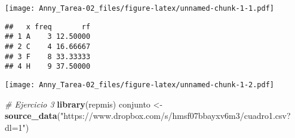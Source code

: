 \documentclass[
]{article}
\newenvironment{Shaded}{\begin{snugshade}}{\end{snugshade}}
\newcommand{\CommentTok}[1]{\textcolor[rgb]{0.56,0.35,0.01}{\textit{#1}}}
\newcommand{\DataTypeTok}[1]{\textcolor[rgb]{0.13,0.29,0.53}{#1}}
\newcommand{\DecValTok}[1]{\textcolor[rgb]{0.00,0.00,0.81}{#1}}
\newcommand{\KeywordTok}[1]{\textcolor[rgb]{0.13,0.29,0.53}{\textbf{#1}}}
\newcommand{\NormalTok}[1]{#1}
\newcommand{\OperatorTok}[1]{\textcolor[rgb]{0.81,0.36,0.00}{\textbf{#1}}}
\newcommand{\StringTok}[1]{\textcolor[rgb]{0.31,0.60,0.02}{#1}}
\begin{document}
\texttt{[image: Anny\_Tarea-02\_files/figure-latex/unnamed-chunk-1-1.pdf]}

\begin{Shaded}
\end{Shaded}

\begin{verbatim}
##   x freq       rf
## 1 A    3 12.50000
## 2 C    4 16.66667
## 3 F    8 33.33333
## 4 H    9 37.50000
\end{verbatim}

\begin{Shaded}
\end{Shaded}

\texttt{[image: Anny\_Tarea-02\_files/figure-latex/unnamed-chunk-1-2.pdf]}

\begin{Shaded}
\begin{Highlighting}[]
\CommentTok{# Ejercicio 3}
\KeywordTok{library}\NormalTok{(repmis) }
\NormalTok{conjunto <-}\StringTok{ }\KeywordTok{source_data}\NormalTok{(}\StringTok{"https://www.dropbox.com/s/hmsf07bbayxv6m3/cuadro1.csv?dl=1"}\NormalTok{)}
\end{Highlighting}
\end{Shaded}
\end{document}
